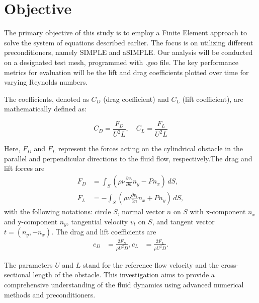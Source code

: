 \documentclass{article}
\begin{document}
\section{Objective}
The primary objective of this study is to employ a Finite Element approach to solve the system of equations described earlier. The focus is on utilizing different preconditioners, namely SIMPLE and aSIMPLE. Our analysis will be conducted on a designated test mesh, programmed with .geo file. The key performance metrics for evaluation will be the lift and drag coefficients plotted over time for varying Reynolds numbers.

The coefficients, denoted as \(C_D\) (drag coefficient) and \(C_L\) (lift coefficient), are mathematically defined as:

\begin{equation}
C_D = \frac{F_D}{U^2L}, \quad C_L = \frac{F_L}{U^2L} \label{eq:coefficients}
\end{equation}

Here, \(F_D\) and \(F_L\) represent the forces acting on the cylindrical obstacle in the parallel and perpendicular directions to the fluid flow, respectively.The drag and lift forces are
\begin{align*}
    F_D &= \int_S \left(\rho\nu \frac{\partial v_t}{\partial n}n_y - Pn_x\right) \, dS, \\
    F_L &= -\int_S \left(\rho\nu \frac{\partial v_t}{\partial n}n_x + Pn_y\right) \, dS,
\end{align*}
with the following notations: circle $S$, normal vector $n$ on $S$ with x-component $n_x$ and y-component $n_y$, tangential velocity $v_t$ on $S$, and tangent vector $t = (n_y, -n_x)$. The drag and lift coefficients are
\begin{align*}
    c_D &= \frac{2F_D}{\rho U^2D}, 
    c_L &= \frac{2F_L}{\rho U^2D}.
\end{align*}

The parameters \(U\) and \(L\) stand for the reference flow velocity and the cross-sectional length of the obstacle. This investigation aims to provide a comprehensive understanding of the fluid dynamics using advanced numerical methods and preconditioners.
\end{document}

